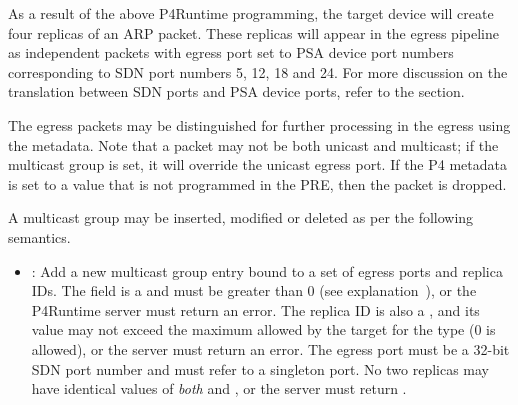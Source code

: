 \documentclass[11pt]{article}
\begin{document}
{%
\noindent{}As a result of the above P4Runtime programming, the target device will create
four replicas of an ARP packet. These replicas will appear in the egress
pipeline as independent packets with egress port set to PSA device port numbers
corresponding to SDN port numbers 5, 12, 18 and 24. For more discussion on the
translation between SDN ports and PSA device ports, refer to the
 section.%

The egress packets may be distinguished for further processing in the egress
using the  metadata. Note that a packet may not be both unicast and
multicast; if the multicast group is set, it will override the unicast egress
port. If the P4  metadata is set to a value that is not
programmed in the PRE, then the packet is dropped.%

A multicast group may be inserted, modified or deleted as per the following
semantics.%

\begin{itemize}[noitemsep,topsep=\mdcompacttopsep]%

\item{}: Add a new multicast group entry bound to a set of egress ports and
replica IDs. The  field is a  and must be greater
than 0 (see explanation~), or the
P4Runtime server must return an  error. The replica
 ID is also a , and its value may not exceed the maximum
allowed by the target for the  type (0 is allowed), or the
server must return an  error. The egress port must be a
32-bit SDN port number and must refer to a singleton port. No two replicas may
have identical values of \emph{both}  and , or the server
must return .%


\end{itemize}}
\end{document}
